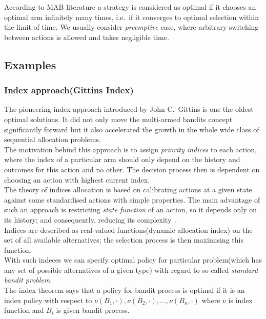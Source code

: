 \documentclass[12pt, a4paper, pdflatex, leqno, twoside]{report}
\begin{document}
According to MAB literature a strategy is considered as optimal if it chooses an optimal arm infinitely many times, i.e.\ if it converges to optimal selection within 
the limit of time. We usually consider \emph{preemptive} case, where arbitrary switching between actions 
is allowed and takes negligible time.\\

\subsection{Examples}

\subsubsection{Index approach(Gittins Index)\label{sec:gitind}}

The pioneering index approach introduced by John C.\ Gittins is one the oldest optimal solutions. It did not only move the multi-armed bandits concept significantly 
forward but it also accelerated the growth in 
the whole wide class of sequential allocation problems.\\

The motivation behind this approach is to assign \emph{priority indices} 
to each action, where the index of a particular arm should only depend on the history 
and outcomes for this action and no other. The decision process then is dependent on choosing an action with highest current index. \\

The theory of indices allocation is based on calibrating actions at a given 
state against some standardised actions with simple properties. The main 
advantage of such an approach is restricting \emph{state function} of an action, so it depends only 
on its history; and consequently, reducing its complexity~\citep{gittins+glazebrook+weber}.\\

Indices are described as real-valued functions(dynamic allocation index) on the 
set of all available alternatives; the selection process is then maximising this 
function.\\
With such indeces we can specify optimal policy for particular problem(which 
has any set of possible alternatives of a given type) with regard to so called 
\emph{standard bandit problem}.\\

The index theorem says that a policy for bandit process is optimal if it is an 
index policy with respect to $\nu(B_1, \cdot), \nu(B_2, \cdot),..., \nu(B_n, 
\cdot)$ where $\nu$ is index function and $B_i$ is given bandit process.\\
\end{document}
